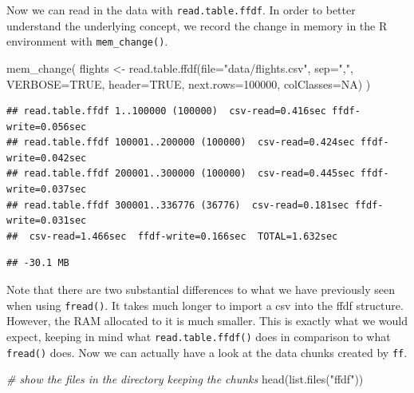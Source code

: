 \documentclass[
  12pt,
]{style/krantz}
\newenvironment{Shaded}{\begin{snugshade}}{\end{snugshade}}
\newcommand{\AttributeTok}[1]{\textcolor[rgb]{0.77,0.63,0.00}{#1}}
\newcommand{\CommentTok}[1]{\textcolor[rgb]{0.56,0.35,0.01}{\textit{#1}}}
\newcommand{\ConstantTok}[1]{\textcolor[rgb]{0.00,0.00,0.00}{#1}}
\newcommand{\DecValTok}[1]{\textcolor[rgb]{0.00,0.00,0.81}{#1}}
\newcommand{\FunctionTok}[1]{\textcolor[rgb]{0.00,0.00,0.00}{#1}}
\newcommand{\NormalTok}[1]{#1}
\newcommand{\OtherTok}[1]{\textcolor[rgb]{0.56,0.35,0.01}{#1}}
\newcommand{\StringTok}[1]{\textcolor[rgb]{0.31,0.60,0.02}{#1}}
\begin{document}
Now we can read in the data with \texttt{read.table.ffdf}. In order to better understand the underlying concept, we record the change in memory in the R environment with \texttt{mem\_change()}.

\begin{Shaded}
\begin{Highlighting}[]
\FunctionTok{mem\_change}\NormalTok{(}
\NormalTok{flights }\OtherTok{\textless{}{-}} 
     \FunctionTok{read.table.ffdf}\NormalTok{(}\AttributeTok{file=}\StringTok{"data/flights.csv"}\NormalTok{,}
                     \AttributeTok{sep=}\StringTok{","}\NormalTok{,}
                     \AttributeTok{VERBOSE=}\ConstantTok{TRUE}\NormalTok{,}
                     \AttributeTok{header=}\ConstantTok{TRUE}\NormalTok{,}
                     \AttributeTok{next.rows=}\DecValTok{100000}\NormalTok{,}
                     \AttributeTok{colClasses=}\ConstantTok{NA}\NormalTok{)}
\NormalTok{)}
\end{Highlighting}
\end{Shaded}

\begin{verbatim}
## read.table.ffdf 1..100000 (100000)  csv-read=0.416sec ffdf-write=0.056sec
## read.table.ffdf 100001..200000 (100000)  csv-read=0.424sec ffdf-write=0.042sec
## read.table.ffdf 200001..300000 (100000)  csv-read=0.445sec ffdf-write=0.037sec
## read.table.ffdf 300001..336776 (36776)  csv-read=0.181sec ffdf-write=0.031sec
##  csv-read=1.466sec  ffdf-write=0.166sec  TOTAL=1.632sec
\end{verbatim}

\begin{verbatim}
## -30.1 MB
\end{verbatim}

Note that there are two substantial differences to what we have previously seen when using \texttt{fread()}. It takes much longer to import a csv into the ffdf structure. However, the RAM allocated to it is much smaller. This is exactly what we would expect, keeping in mind what \texttt{read.table.ffdf()} does in comparison to what \texttt{fread()} does. Now we can actually have a look at the data chunks created by \texttt{ff}.

\begin{Shaded}
\begin{Highlighting}[]
\CommentTok{\# show the files in the directory keeping the chunks}
\FunctionTok{head}\NormalTok{(}\FunctionTok{list.files}\NormalTok{(}\StringTok{"ffdf"}\NormalTok{))}
\end{Highlighting}
\end{Shaded}
\end{document}
